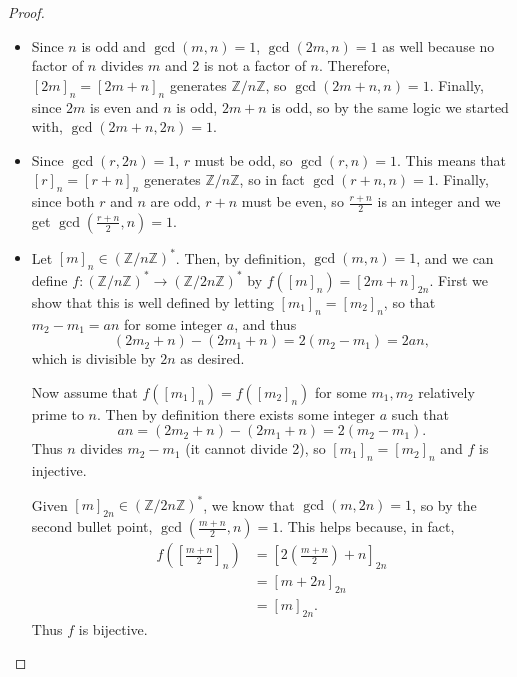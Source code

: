 \documentclass{article}
\theoremstyle{definition}
\begin{document}
\begin{proof}\
	\begin{itemize}
		\item Since $n$ is odd and $\gcd(m, n) = 1$, $\gcd(2m, n) = 1$ as well because no factor of $n$ divides $m$ and 2 is not a factor of $n$.
		      Therefore, $[2m]_n = [2m + n]_n$ generates $\mathbb{Z}/n \mathbb{Z}$, so $\gcd(2m + n, n) = 1$.
		      Finally, since $2m$ is even and $n$ is odd, $2m + n$ is odd, so by the same logic we started with, $\gcd(2m + n, 2n) = 1$.
		\item Since $\gcd(r, 2n) = 1$, $r$ must be odd, so $\gcd(r, n) = 1$.
		      This means that $[r]_n = [r + n]_n$ generates $\mathbb{Z}/n \mathbb{Z}$, so in fact $\gcd(r + n, n) = 1$.
		      Finally, since both $r$ and $n$ are odd, $r + n$ must be even, so $\frac{r + n}{2}$ is an integer and we get $\gcd(\frac{r + n}{2}, n) = 1$.
		\item Let $[m]_n \in (\mathbb{Z}/n \mathbb{Z})^*$.
		      Then, by definition, $\gcd(m, n) = 1$, and we can define $f: (\mathbb{Z}/n \mathbb{Z})^* \to (\mathbb{Z}/{2n}\mathbb{Z})^*$ by $f([m]_n) = [2m + n]_{2n}$.
		      First we show that this is well defined by letting $[m_1]_n = [m_2]_n$, so that $m_2 - m_1 = an$ for some integer $a$, and thus \begin{equation*}
			      (2m_2 + n) - (2m_1 + n) = 2(m_2 - m_1) = 2an,
		      \end{equation*}
		      which is divisible by $2n$ as desired.

		      Now assume that $f([m_1]_n) = f([m_2]_n)$ for some $m_1, m_2$ relatively prime to $n$.
		      Then by definition there exists some integer $a$ such that \begin{equation*}
			      an = (2m_2 + n) - (2m_1 + n) = 2(m_2 - m_1).
		      \end{equation*}
		      Thus $n$ divides $m_2 - m_1$ (it cannot divide 2), so $[m_1]_n = [m_2]_n$ and $f$ is injective.

		      Given $[m]_{2n} \in (\mathbb{Z}/{2n}\mathbb{Z})^*$, we know that $\gcd(m, 2n) = 1$, so by the second bullet point, $\gcd(\frac{m + n}{2}, n) = 1$.
		      This helps because, in fact, \begin{align*}
			      f\left(\left[\frac{m + n}{2}\right]_n\right) & = \left[ 2\left(\frac{m + n}{2}\right) + n \right]_{2n} \\
			                                                   & = \left[ m + 2n \right]_{2n}                            \\
			                                                   & = \left[ m \right]_{2n}.
		      \end{align*}
		      Thus $f$ is bijective.
	\end{itemize}
\end{proof}
\end{document}
